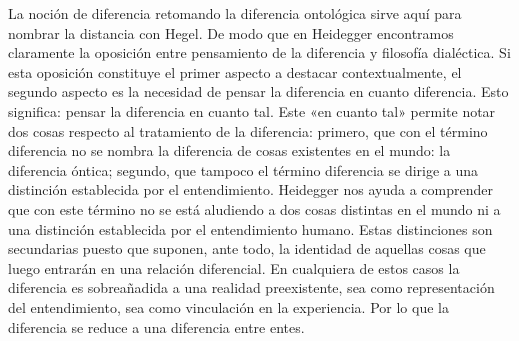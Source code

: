 La noción de diferencia retomando la diferencia ontológica sirve aquí para nombrar la distancia con Hegel. De modo que en Heidegger encontramos claramente la oposición entre pensamiento de la diferencia y filosofía dialéctica. Si esta oposición constituye el primer aspecto a destacar contextualmente, el segundo aspecto es la necesidad de pensar la diferencia en cuanto diferencia. Esto significa: pensar la diferencia en cuanto tal. Este «en cuanto tal» permite notar dos cosas respecto al tratamiento de la diferencia: primero, que con el término diferencia no se nombra la diferencia de cosas existentes en el mundo: la diferencia óntica; segundo, que tampoco el término diferencia se dirige a una distinción establecida por el entendimiento. Heidegger nos ayuda a comprender que con este término no se está aludiendo a dos cosas distintas en el mundo ni a una distinción establecida por el entendimiento humano. Estas distinciones son secundarias puesto que suponen, ante todo, la identidad de aquellas cosas que luego entrarán en una relación diferencial. En cualquiera de estos casos la diferencia es sobreañadida a una realidad preexistente, sea como representación del entendimiento, sea como vinculación en la experiencia. Por lo que la diferencia se reduce a una diferencia entre entes.

